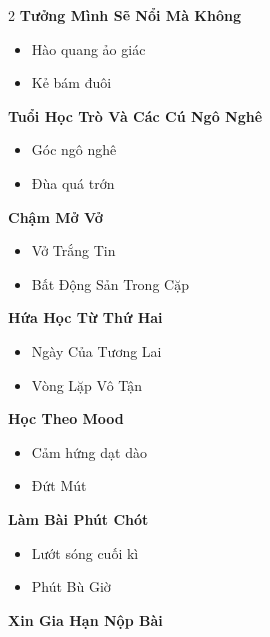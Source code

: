 \begin{multicols}{2}
\textbf{\color{chapterline}Tưởng Mình Sẽ Nổi Mà Không}
\begin{itemize}[leftmargin=1.2em, itemsep=0.1em, label=\textcolor{titlecolor}{\tiny$\blacksquare$}]
  \item Hào quang ảo giác
  \item Kẻ bám đuôi
\end{itemize}
\vspace{0.8em}
\textbf{\color{chapterline}Tuổi Học Trò Và Các Cú Ngô Nghê}
\begin{itemize}[leftmargin=1.2em, itemsep=0.1em, label=\textcolor{titlecolor}{\tiny$\blacksquare$}]
  \item Góc ngô nghê
  \item Đùa quá trớn
\end{itemize}
\vspace{0.8em}
\textbf{\color{chapterline}Chậm Mở Vở}
\begin{itemize}[leftmargin=1.2em, itemsep=0.1em, label=\textcolor{titlecolor}{\tiny$\blacksquare$}]
  \item Vở Trắng Tin
  \item Bất Động Sản Trong Cặp
\end{itemize}
\vspace{0.8em}
\textbf{\color{chapterline}Hứa Học Từ Thứ Hai}
\begin{itemize}[leftmargin=1.2em, itemsep=0.1em, label=\textcolor{titlecolor}{\tiny$\blacksquare$}]
  \item Ngày Của Tương Lai
  \item Vòng Lặp Vô Tận
\end{itemize}
\vspace{0.8em}
\textbf{\color{chapterline}Học Theo Mood}
\begin{itemize}[leftmargin=1.2em, itemsep=0.1em, label=\textcolor{titlecolor}{\tiny$\blacksquare$}]
  \item Cảm hứng dạt dào
  \item Đứt Mút
\end{itemize}
\vspace{0.8em}
\textbf{\color{chapterline}Làm Bài Phút Chót}
\begin{itemize}[leftmargin=1.2em, itemsep=0.1em, label=\textcolor{titlecolor}{\tiny$\blacksquare$}]
  \item Lướt sóng cuối kì
  \item Phút Bù Giờ
\end{itemize}
\vspace{0.8em}
\textbf{\color{chapterline}Xin Gia Hạn Nộp Bài}
\begin{itemize}[leftmargin=1.2em, itemsep=0.1em, label=\textcolor{titlecolor}{\tiny$\blacksquare$}]

\end{itemize}
\end{multicols}
